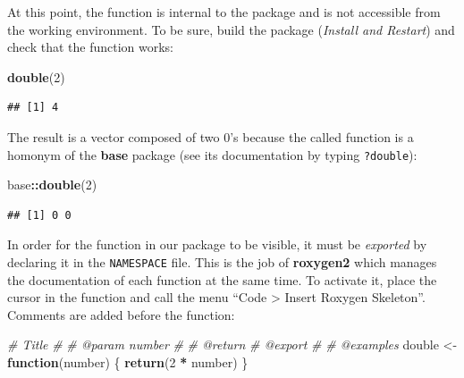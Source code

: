 \documentclass[
  12pt,
  american,
  a4paper,
  extrafontsizes,onecolumn,openright
  ]{memoir}
\newenvironment{Shaded}{\begin{snugshade}}{\end{snugshade}}
\newcommand{\CommentTok}[1]{\textcolor[rgb]{0.56,0.35,0.01}{\textit{#1}}}
\newcommand{\ControlFlowTok}[1]{\textcolor[rgb]{0.13,0.29,0.53}{\textbf{#1}}}
\newcommand{\DecValTok}[1]{\textcolor[rgb]{0.00,0.00,0.81}{#1}}
\newcommand{\FunctionTok}[1]{\textcolor[rgb]{0.13,0.29,0.53}{\textbf{#1}}}
\newcommand{\NormalTok}[1]{#1}
\newcommand{\OtherTok}[1]{\textcolor[rgb]{0.56,0.35,0.01}{#1}}
\newcommand{\SpecialCharTok}[1]{\textcolor[rgb]{0.81,0.36,0.00}{\textbf{#1}}}
\begin{document}
At this point, the function is internal to the package and is not accessible from the working environment.
To be sure, build the package (\emph{Install and Restart}) and check that the function works:

\scriptsize

\begin{Shaded}
\begin{Highlighting}[]
\FunctionTok{double}\NormalTok{(}\DecValTok{2}\NormalTok{)}
\end{Highlighting}
\end{Shaded}

\begin{verbatim}
## [1] 4
\end{verbatim}

\normalsize

The result is a vector composed of two 0's because the called function is a homonym of the \textbf{base} package (see its documentation by typing \texttt{?double}):

\scriptsize

\begin{Shaded}
\begin{Highlighting}[]
\NormalTok{base}\SpecialCharTok{::}\FunctionTok{double}\NormalTok{(}\DecValTok{2}\NormalTok{)}
\end{Highlighting}
\end{Shaded}

\begin{verbatim}
## [1] 0 0
\end{verbatim}

\normalsize

In order for the function in our package to be visible, it must be \emph{exported} by declaring it in the \texttt{NAMESPACE} file.
This is the job of \textbf{roxygen2} which manages the documentation of each function at the same time.
To activate it, place the cursor in the function and call the menu \enquote{Code \textgreater{} Insert Roxygen Skeleton}.
Comments are added before the function:

\scriptsize

\begin{Shaded}
\begin{Highlighting}[]
\CommentTok{\#\textquotesingle{} Title}
\CommentTok{\#\textquotesingle{}}
\CommentTok{\#\textquotesingle{} @param number }
\CommentTok{\#\textquotesingle{}}
\CommentTok{\#\textquotesingle{} @return}
\CommentTok{\#\textquotesingle{} @export}
\CommentTok{\#\textquotesingle{}}
\CommentTok{\#\textquotesingle{} @examples}
\NormalTok{double }\OtherTok{\textless{}{-}} \ControlFlowTok{function}\NormalTok{(number) \{}
  \FunctionTok{return}\NormalTok{(}\DecValTok{2} \SpecialCharTok{*}\NormalTok{ number)}
\NormalTok{\}}
\end{Highlighting}
\end{Shaded}
\end{document}
